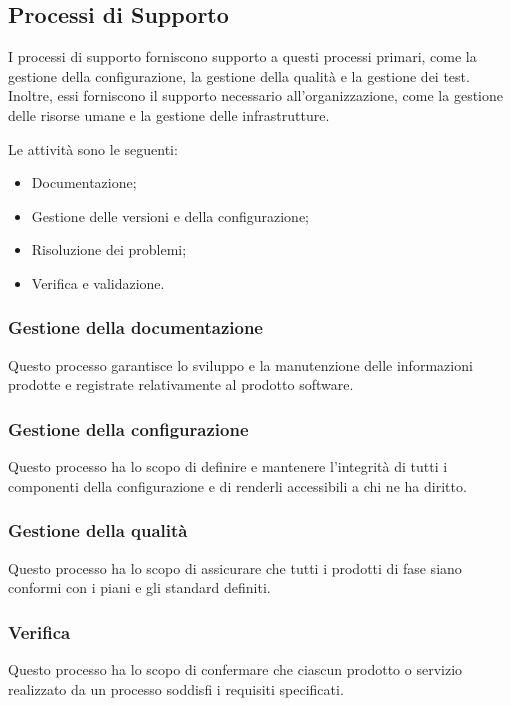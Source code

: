 \subsection{Processi di Supporto}
I processi di supporto forniscono supporto a questi processi primari, come la gestione della configurazione, la gestione della qualità e la gestione dei test. Inoltre, essi forniscono il supporto necessario all'organizzazione, come la gestione delle risorse umane e la gestione delle infrastrutture.

Le attività sono le seguenti:
\begin{itemize}
    \item Documentazione;
    \item Gestione delle versioni e della configurazione;
    \item Risoluzione dei problemi;
    \item Verifica e validazione.
\end{itemize}

\subsubsection{Gestione della documentazione}

Questo processo garantisce lo sviluppo e la manutenzione delle informazioni prodotte e registrate relativamente al prodotto software.


\subsubsection{Gestione della configurazione}

Questo processo ha lo scopo di definire e mantenere l'integrità di tutti i componenti della configurazione e di renderli accessibili a chi ne ha diritto.


\subsubsection{Gestione della qualità}

Questo processo ha lo scopo di assicurare che tutti i prodotti di fase siano conformi con i piani e gli standard definiti.


\subsubsection{Verifica}

Questo processo ha lo scopo di confermare che ciascun prodotto o servizio realizzato da un processo soddisfi i requisiti specificati.

